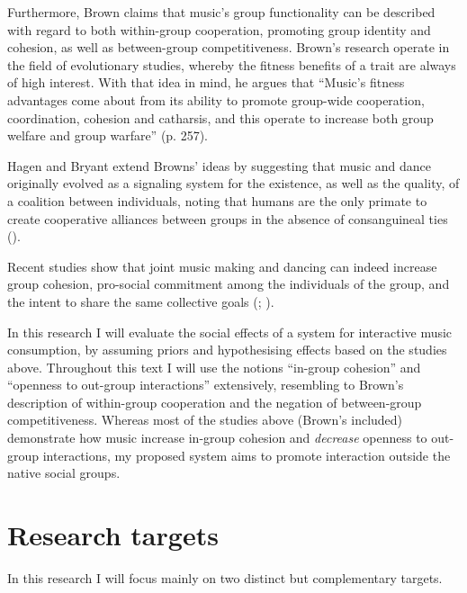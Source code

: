 \documentclass[a4paper,11pt]{article}
\begin{document}
Furthermore, Brown claims that music's group functionality can be described with regard to both within-group cooperation, promoting group identity and cohesion, as well as between-group competitiveness.
Brown's research operate in the field of evolutionary studies, whereby the fitness benefits of a trait are always of high interest.
With that idea in mind, he argues that ``Music's fitness advantages come about from its ability to promote group-wide cooperation, coordination, cohesion and catharsis, and this operate to increase both group welfare and group warfare'' (p. 257).

Hagen and Bryant extend Browns' ideas by suggesting that music and dance originally evolved as a signaling system for the existence, as well as the quality, of a coalition between individuals, noting that humans are the only primate to create cooperative alliances between groups in the absence of consanguineal ties (\cite*{Hagen2003}).

Recent studies show that joint music making and dancing can indeed increase group cohesion, pro-social commitment among the individuals of the group, and the intent to share the same collective goals (\cite{Kirschner2010}; \cite{Knoblich2011}).

In this research I will evaluate the social effects of a system for interactive music consumption, by assuming priors and hypothesising effects based on the studies above.
Throughout this text I will use the notions ``in-group cohesion'' and ``openness to out-group interactions'' extensively, resembling to Brown's description of within-group cooperation and the negation of between-group competitiveness.
Whereas most of the studies above (Brown's included) demonstrate how music increase in-group cohesion and \emph{decrease} openness to out-group interactions, my proposed system aims to promote interaction outside the native social groups.

\section{Research targets}

In this research I will focus mainly on two distinct but complementary targets.
\end{document}
